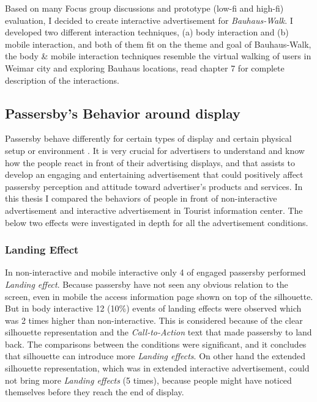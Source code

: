 Based on many Focus group discussions and prototype (low-fi and high-fi) evaluation, I decided to create interactive advertisement for \emph{Bauhaus-Walk}. I developed two different interaction techniques, (a) body interaction and (b) mobile interaction, and both of them fit on the theme and goal of Bauhaus-Walk, the body \& mobile interaction techniques resemble the virtual walking of users in Weimar city and exploring Bauhaus locations, read chapter 7 for complete description of the interactions.


\subsection{Passersby's Behavior around display}
Passersby behave differently for certain types of display\cite{CylindricalScreen}   and certain physical setup or environment \cite{chained_displays, LookingGlass}. It is very crucial for advertisers to understand and know how the people react in front of their advertising displays, and that assists to develop an engaging and entertaining advertisement that could positively affect passersby perception and attitude toward advertiser’s products and services. In this thesis I compared the behaviors of people in front of non-interactive advertisement and interactive advertisement in Tourist information center. The below two effects were investigated in depth for all the advertisement conditions.

\subsubsection{Landing Effect}
In non-interactive and mobile interactive only 4 of engaged passersby performed  \emph{Landing effect}. Because passersby have not seen any obvious  relation to the screen, even in mobile the access information page shown on top of the silhouette. But in body interactive 12 (10\%) events of landing effects were observed which was 2 times higher than non-interactive. This is considered because of the clear silhouette representation and the \emph{Call-to-Action} text that made passersby to land back. The comparisons between the conditions were significant, and it concludes that silhouette can introduce more \emph{Landing effects}. On other hand the extended silhouette representation, which was in extended interactive advertisement, could not bring more \emph{Landing effects} (5 times), because people might have noticed themselves before they reach the end of display.

